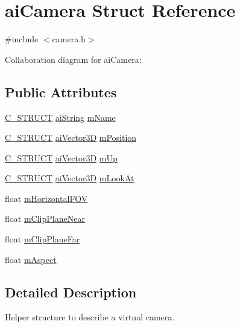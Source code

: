 \hypertarget{structai_camera}{\section{ai\-Camera Struct Reference}
\label{structai_camera}
}


{\ttfamily \#include $<$camera.\-h$>$}



Collaboration diagram for ai\-Camera\-:
\subsection*{Public Attributes}
\begin{DoxyCompactItemize}
\item 
\hyperlink{defs_8h_ab51df4230ceb602bbc1bc109c432a6a0}{C\-\_\-\-S\-T\-R\-U\-C\-T} \hyperlink{structai_string}{ai\-String} \hyperlink{structai_camera_aa6a5fe5e04b3db1b23f69eb9910c6816}{m\-Name}
\item 
\hyperlink{defs_8h_ab51df4230ceb602bbc1bc109c432a6a0}{C\-\_\-\-S\-T\-R\-U\-C\-T} \hyperlink{structai_vector3_d}{ai\-Vector3\-D} \hyperlink{structai_camera_a518617ea192ca0698e748a4399e7c3a5}{m\-Position}
\item 
\hyperlink{defs_8h_ab51df4230ceb602bbc1bc109c432a6a0}{C\-\_\-\-S\-T\-R\-U\-C\-T} \hyperlink{structai_vector3_d}{ai\-Vector3\-D} \hyperlink{structai_camera_a7fb42b287389b4f99c883098268d6d1a}{m\-Up}
\item 
\hyperlink{defs_8h_ab51df4230ceb602bbc1bc109c432a6a0}{C\-\_\-\-S\-T\-R\-U\-C\-T} \hyperlink{structai_vector3_d}{ai\-Vector3\-D} \hyperlink{structai_camera_af9463249ac870e030fa435b1186cef23}{m\-Look\-At}
\item 
float \hyperlink{structai_camera_adcdea73ece19ea0a9068f5544ec23592}{m\-Horizontal\-F\-O\-V}
\item 
float \hyperlink{structai_camera_a720e8c94c036dcefe4b13cc1c69c521e}{m\-Clip\-Plane\-Near}
\item 
float \hyperlink{structai_camera_aa9ccf77e3d7ca3dc8f46df931b65172f}{m\-Clip\-Plane\-Far}
\item 
float \hyperlink{structai_camera_ae414556eaa6f910b5927f465d97bf70c}{m\-Aspect}
\end{DoxyCompactItemize}


\subsection{Detailed Description}
Helper structure to describe a virtual camera.

